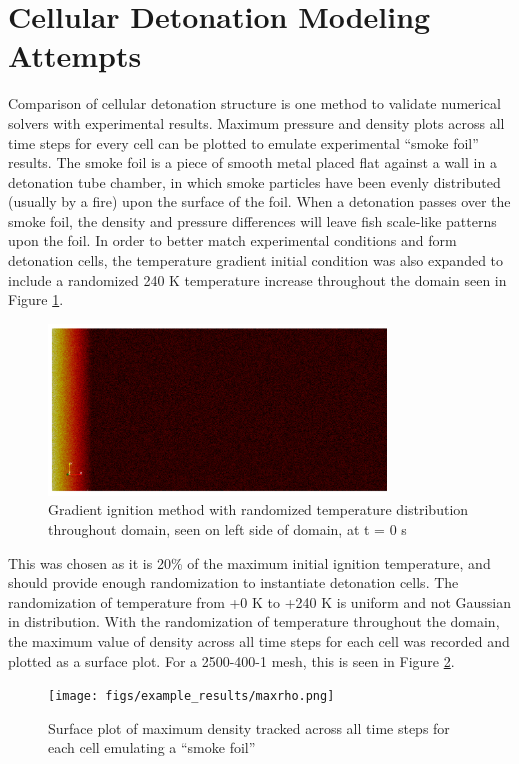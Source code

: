 \section{Cellular Detonation Modeling Attempts}
Comparison of cellular detonation structure is one method to validate numerical solvers with experimental results. Maximum pressure and density plots across all time steps for every cell can be plotted to emulate experimental ``smoke foil'' results. The smoke foil is a piece of smooth metal placed flat against a wall in a detonation tube chamber, in which smoke particles have been evenly distributed (usually by a fire) upon the surface of the foil. When a detonation passes over the smoke foil, the density and pressure differences will leave fish scale-like patterns upon the foil. 
In order to better match experimental conditions and form detonation cells, the temperature gradient initial condition was also expanded to include a randomized 240 K temperature increase throughout the domain seen in Figure \ref{fig:gradrand}. 
\begin{figure}[h]
\centering
\includegraphics[width=0.8\textwidth]{figs/ignition/randgrad.png}
\caption{Gradient ignition method with randomized temperature distribution throughout domain, seen on left side of domain, at t = 0 s}
\label{fig:gradrand}
\end{figure}%
\noindent This was chosen as it is 20\% of the maximum initial ignition temperature, and should provide enough randomization to instantiate detonation cells. The randomization of temperature from +0 K to +240 K is uniform and not Gaussian in distribution. With the randomization of temperature throughout the domain, the maximum value of density across all time steps for each cell was recorded and plotted as a surface plot. 
For a 2500-400-1 mesh, this is seen in Figure \ref{fig:maxrho}.
\begin{figure}[h]
\centering
\texttt{[image: figs/example\_results/maxrho.png]}
\caption{Surface plot of maximum density tracked across all time steps for each cell emulating a ``smoke foil''}
\label{fig:maxrho}
\end{figure}
